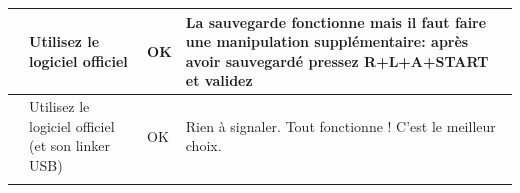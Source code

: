 \documentclass[12pt,a4paper]{article}
\begin{document}
    \tablelasttail{\hline}
    \begin{supertabular}{|p{3.5cm}|l|l|l|}
        \hline
            \begin{minipage}[c]{3cm}
            \vspace{0.5cm}
            \end{minipage} & 
            \begin{minipage}{3cm}
            Utilisez le logiciel officiel
            \end{minipage} &
            \begin{minipage}{2cm}
            \textcolor{vert}{OK}
            \end{minipage} &
            \begin{minipage}{7cm}
            La sauvegarde fonctionne mais il faut faire une manipulation supplémentaire: après avoir sauvegardé {\bf pressez R+L+A+START et validez}
            \end{minipage} \\
        \hline
            \begin{minipage}[c]{3cm}
            \vspace{0.5cm}
            \end{minipage} & 
            \begin{minipage}{3cm}
            Utilisez le logiciel officiel (et son linker USB)
            \end{minipage} &
            \begin{minipage}{2cm}
            \textcolor{vert}{OK}
            \end{minipage} &
            \begin{minipage}{7cm}
            Rien à signaler. Tout fonctionne ! C'est le meilleur choix.
            \end{minipage} \\
        \hline
            \begin{minipage}[c]{3cm}
            \vspace{0.5cm}

\end{minipage}
\end{supertabular}
\end{document}
